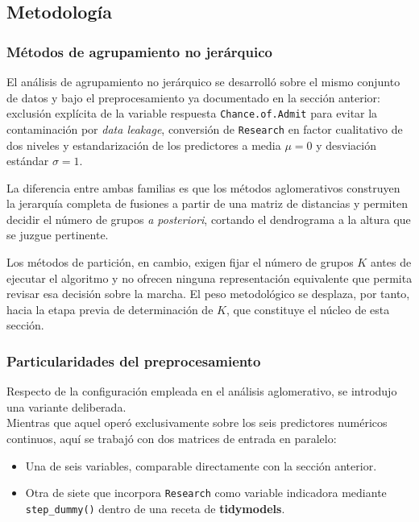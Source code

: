 \documentclass[
  10pt,
  a4paper]{article}
\providecommand{\tightlist}{%
  \setlength{\itemsep}{0pt}\setlength{\parskip}{0pt}}
\begin{document}
\subsection{Metodología}\label{metodologuxeda-1}

\subsubsection{Métodos de agrupamiento no jerárquico}\label{muxe9todos-de-agrupamiento-no-jeruxe1rquico}

El análisis de agrupamiento no jerárquico se desarrolló sobre el mismo conjunto de datos y bajo el preprocesamiento ya documentado en la sección anterior: exclusión explícita de la variable respuesta \texttt{Chance.of.Admit} para evitar la contaminación por \emph{data leakage}, conversión de \texttt{Research} en factor cualitativo de dos niveles y estandarización de los predictores a media \(\mu = 0\) y desviación estándar \(\sigma = 1\).

La diferencia entre ambas familias es que los métodos aglomerativos construyen la jerarquía completa de fusiones a partir de una matriz de distancias y permiten decidir el número de grupos \emph{a posteriori}, cortando el dendrograma a la altura que se juzgue pertinente.

Los métodos de partición, en cambio, exigen fijar el número de grupos \(K\) antes de ejecutar el algoritmo y no ofrecen ninguna representación equivalente que permita revisar esa decisión sobre la marcha. El peso metodológico se desplaza, por tanto, hacia la etapa previa de determinación de \(K\), que constituye el núcleo de esta sección.

\subsubsection{Particularidades del preprocesamiento}\label{particularidades-del-preprocesamiento}

Respecto de la configuración empleada en el análisis aglomerativo, se introdujo una variante deliberada.\\
Mientras que aquel operó exclusivamente sobre los seis predictores numéricos continuos, aquí se trabajó con dos matrices de entrada en paralelo:

\begin{itemize}
\tightlist
\item
  Una de seis variables, comparable directamente con la sección anterior.\\
\item
  Otra de siete que incorpora \texttt{Research} como variable indicadora mediante \texttt{step\_dummy()} dentro de una receta de \textbf{tidymodels}.
\end{itemize}
\end{document}
